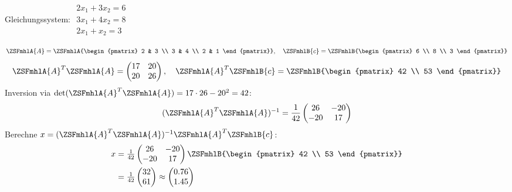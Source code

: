 \begin{defbox}[Beispiel][weight=quiet]
  Gleichungssystem: $\begin{matrix} 2x_1 + 3x_2 = 6 \\ 3x_1 + 4x_2 = 8 \\ 2x_1 + x_2 = 3 \end{matrix}$
  \ZSFgap[XS]
  
  \[
  \ZSFmhlA{A} = \ZSFmhlA{\begin{pmatrix} 2 & 3 \\ 3 & 4 \\ 2 & 1 \end{pmatrix}}, \quad \ZSFmhlB{c} = \ZSFmhlB{\begin{pmatrix} 6 \\ 8 \\ 3 \end{pmatrix}}
  \]
  \[
  \ZSFmhlA{A}^T \ZSFmhlA{A} = \begin{pmatrix} 17 & 20 \\ 20 & 26 \end{pmatrix}, \quad \ZSFmhlA{A}^T \ZSFmhlB{c} = \ZSFmhlB{\begin{pmatrix} 42 \\ 53 \end{pmatrix}}
  \]
  Inversion via $\det(\ZSFmhlA{A}^T \ZSFmhlA{A}) = 17 \cdot 26 - 20^2 = 42$:
  \[
  (\ZSFmhlA{A}^T \ZSFmhlA{A})^{-1} = \frac{1}{42} \begin{pmatrix} 26 & -20 \\ -20 & 17 \end{pmatrix}
  \]
  Berechne $x = (\ZSFmhlA{A}^T \ZSFmhlA{A})^{-1} \ZSFmhlA{A}^T \ZSFmhlB{c}$:
  \[
  \begin{aligned}
  x &= \tfrac{1}{42} \begin{pmatrix} 26 & -20 \\ -20 & 17 \end{pmatrix} \ZSFmhlB{\begin{pmatrix} 42 \\ 53 \end{pmatrix}} \\
  &= \tfrac{1}{42} \begin{pmatrix} 32 \\ 61 \end{pmatrix} \approx \begin{pmatrix} 0.76 \\ 1.45 \end{pmatrix}
  \end{aligned}
  \]
\end{defbox}

